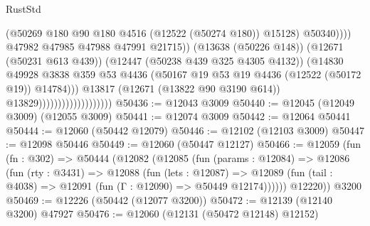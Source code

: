 \begin{lexlean}{RustStd}
\begin{coremodule}
                                                        (@50269
                                                          @180
                                                          @90
                                                          @180
                                                          @4516
                                                          (@12522 (@50274 @180))
                                                          @15128)
                                                        @50340))))
                                                @47982
                                                @47985
                                                @47988
                                                @47991
                                                @21715))
                                            (@13638 (@50226 @148))
                                            (@12671 (@50231 @613 @439))
                                            (@12447 (@50238 @439 @325 @4305 @4132))
                                            (@14830
                                              @49928
                                              @3838
                                              @359
                                              @53
                                              @4436
                                              (@50167
                                                @19
                                                @53
                                                @19
                                                @4436
                                                (@12522 (@50172 @19))
                                                @14784)))
                                          @13817
                                          (@12671 (@13822 @90 @3190 @614))
                                          @13829)))))))))))))))))))
@50436 := @12043 @3009
@50440 := @12045 (@12049 @3009) (@12055 @3009)
@50441 := @12074 @3009
@50442 := @12064 @50441
@50444 := @12060 (@50442 @12079)
@50446 := @12102 (@12103 @3009)
@50447 := @12098 @50446
@50449 := @12060 (@50447 @12127)
@50466 := @12059
    (fun (fn : @302) =>
    @50444
      (@12082
        (@12085
          (fun (params : @12084) =>
          @12086
            (fun (rty : @3431) =>
            @12088
              (fun (lets : @12087) =>
              @12089 (fun (tail : @4038) => @12091 (fun (Γ : @12090) => @50449 @12174))))))
        @12220))
    @3200
@50469 := @12226 (@50442 (@12077 @3200))
@50472 := @12139 (@12140 @3200) @47927
@50476 := @12060 (@12131 (@50472 @12148) @12152)

\end{coremodule}
\end{lexlean}
